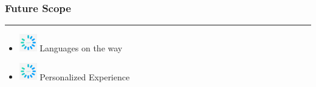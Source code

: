 \documentclass[14pt]{beamer}
\begin{document}
\begin{frame}
    \frametitle{Future Scope}
	\noindent
    {\color{pink} \rule{\linewidth}{0.7mm}} 
         \begin{itemize}
 \item [] \includegraphics[width=0.3in, height=0.3in]{./Codiac/logos/loading.jpg} Languages on the way\\
     
 \item [] \includegraphics[width=0.3in, height=0.3in]{./Codiac/logos/loading.jpg} Personalized Experience \\
 \end{itemize}
\noindent{	
	   \color{pink} \rule{\linewidth}{0.7mm} }   	
\end{frame}	
\end{document}
